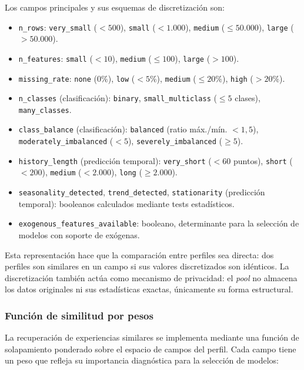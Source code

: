 Los campos principales y sus esquemas de discretización son:

\begin{itemize}
  \item \texttt{n\_rows}: \texttt{very\_small} ($<500$), \texttt{small} ($<1.000$), \texttt{medium} ($\leq 50.000$), \texttt{large} ($>50.000$).
  \item \texttt{n\_features}: \texttt{small} ($<10$), \texttt{medium} ($\leq 100$), \texttt{large} ($>100$).
  \item \texttt{missing\_rate}: \texttt{none} ($0\%$), \texttt{low} ($<5\%$), \texttt{medium} ($\leq 20\%$), \texttt{high} ($>20\%$).
  \item \texttt{n\_classes} (clasificación): \texttt{binary}, \texttt{small\_multiclass} ($\leq 5$ clases), \texttt{many\_classes}.
  \item \texttt{class\_balance} (clasificación): \texttt{balanced} (ratio máx./mín. $< 1{,}5$), \texttt{moderately\_imbalanced} ($< 5$), \texttt{severely\_imbalanced} ($\geq 5$).
  \item \texttt{history\_length} (predicción temporal): \texttt{very\_short} ($<60$ puntos), \texttt{short} ($<200$), \texttt{medium} ($<2.000$), \texttt{long} ($\geq 2.000$).
  \item \texttt{seasonality\_detected}, \texttt{trend\_detected}, \texttt{stationarity} (predicción temporal): booleanos calculados mediante tests estadísticos.
  \item \texttt{exogenous\_features\_available}: booleano, determinante para la selección de modelos con soporte de exógenas.
\end{itemize}

Esta representación hace que la comparación entre perfiles sea directa: dos perfiles son similares en un campo si sus valores discretizados son idénticos. La discretización también actúa como mecanismo de privacidad: el \emph{pool} no almacena los datos originales ni sus estadísticas exactas, únicamente su forma estructural.

\subsubsection*{Función de similitud por pesos}
\label{sec:similarity-function}

La recuperación de experiencias similares se implementa mediante una función de solapamiento ponderado sobre el espacio de campos del perfil. Cada campo tiene un peso que refleja su importancia diagnóstica para la selección de modelos:

